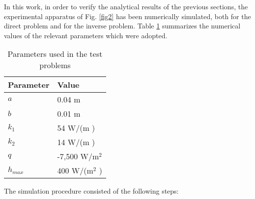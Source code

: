\documentclass[conference,compsoc,fleqn]{IEEEtran}
\begin{document}

In this work, in order to verify the analytical results of the previous sections, the experimental apparatus of Fig. \ref{fig2} has been numerically simulated, both for the direct problem and for the inverse problem. Table \ref{tabela_params} summarizes the numerical values of the relevant parameters which were adopted. 
\begin{table}[H]
	\centering
	\caption{Parameters used in the test problems}
	\begin{tabular}{|l|l|}
		\hline
		\textbf{Parameter} & \textbf{Value}  \\ \hline
		$a$       & 0.04 m   \\ \hline
		$b$       & 0.01 m     \\ \hline
		$k_1$     & 54 W/(m \celsius)  \\ \hline
		$k_2$     & 14 W/(m \celsius) \\ \hline
		$q$       & -7,500 W/$\text{m}^2$ \\ \hline
		$h_{max}$       & 400 W/($\text{m}^2$ \celsius) \\ \hline
	\end{tabular}		
	\label{tabela_params}
\end{table}
The simulation procedure consisted of the following steps:
\end{document}

